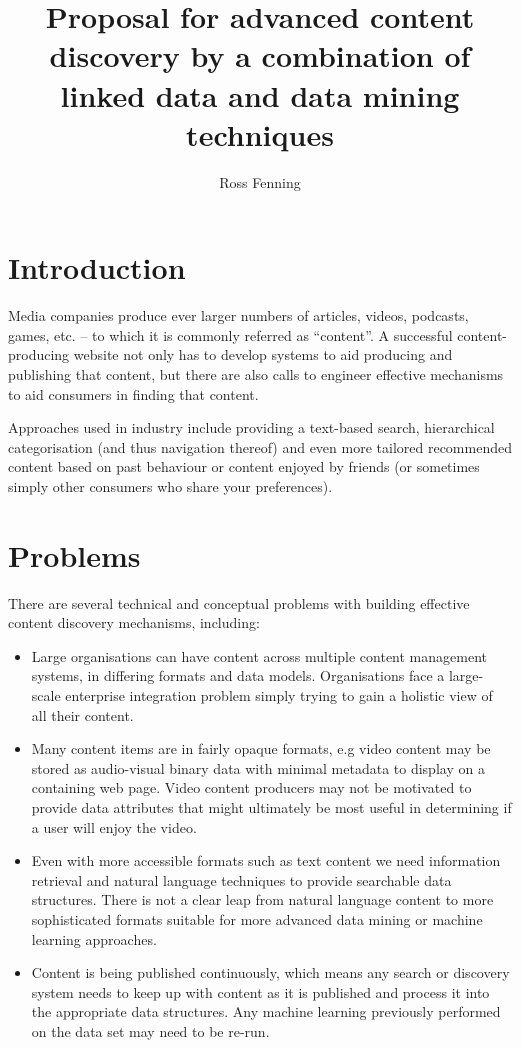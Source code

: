\documentclass[10pt,a4paper]{article}
\title{Proposal for advanced content discovery by a combination of linked data
and data mining techniques}
\author{Ross Fenning}
\date{}
\begin{document}
\maketitle \thispagestyle{empty}

\section{Introduction}

Media companies produce ever larger numbers of articles, videos, podcasts,
games, etc. -- to which it is commonly referred as ``content''. A successful
content-producing website not only has to develop systems to aid producing and
publishing that content, but there are also calls to engineer effective
mechanisms to aid consumers in finding that content.

Approaches used in industry include providing a text-based search, hierarchical
categorisation (and thus navigation thereof) and even more tailored recommended
content based on past behaviour or content enjoyed by friends (or sometimes
simply other consumers who share your preferences).

\section{Problems}

There are several technical and conceptual problems with building effective
content discovery mechanisms, including:

\begin{itemize}

\item Large organisations can have content across multiple content management
systems, in differing formats and data models. Organisations face a large-scale
enterprise integration problem simply trying to gain a holistic view of all
their content.

\item Many content items are in fairly opaque formats, e.g video content may be
stored as audio-visual binary data with minimal metadata to display on a
containing web page. Video content producers may not be motivated to provide
data attributes that might ultimately be most useful in determining if a user
will enjoy the video.

\item Even with more accessible formats such as text content we need information
retrieval and natural language techniques to provide searchable data structures.
There is not a clear leap from natural language content to more sophisticated
formats suitable for more advanced data mining or machine learning approaches.

\item Content is being published continuously, which means any search or
discovery system needs to keep up with content as it is published and process it
into the appropriate data structures. Any machine learning previously performed
on the data set may need to be re-run.

\end{itemize}
\end{document}
